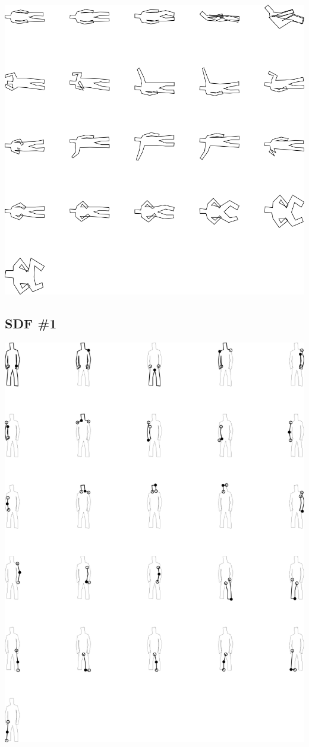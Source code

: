 \includegraphics[width=6in]{output/3.learning/learning_setup/learning_setup_validation_.png}
\subsection{SDF \#1}

\includegraphics[width=6in]{output/3.learning/learning_setup/learning_setup_sdf0_.png}
